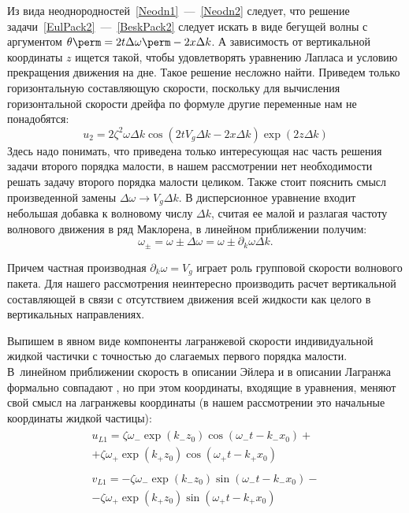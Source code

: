 Из вида неоднородностей~\eqref{Neodn1}~---~\eqref{Neodn2} следует, что решение задачи~\eqref{EulPack2}~---~\eqref{BeskPack2} следует искать в виде бегущей волны с аргументом  $ \theta\perm= 2 t \Delta \omega \perm- 2 x \Delta k $. А зависимость от вертикальной координаты $ z $  ищется такой, чтобы удовлетворять уравнению Лапласа и условию прекращения движения на дне. Такое решение несложно найти. Приведем только горизонтальную составляющую скорости, поскольку для вычисления горизонтальной скорости дрейфа по формуле  другие переменные нам не понадобятся:
\begin{equation*}
u_{2}=2\zeta^{2}\omega \Delta k \cos \left( 2 t V_{g} \Delta k - 2 x \Delta k \right) \exp \left( 2 z \Delta k \right)
\end{equation*}
Здесь надо понимать, что приведена только интересующая нас часть решения задачи второго порядка малости, в нашем рассмотрении нет необходимости решать задачу второго порядка малости целиком. Также стоит пояснить смысл произведенной замены  $ \Delta \omega \rightarrow V_{g} \Delta k $. В дисперсионное уравнение входит небольшая добавка к волновому числу  $ \Delta k $, считая ее малой и разлагая частоту волнового движения в ряд Маклорена, в линейном приближении получим:
\begin{equation*}
\omega_{\pm}=\omega \pm \Delta \omega = \omega \pm \partial_{k} \omega \Delta k.
\end{equation*}

Причем частная производная  $ \partial_{k}\omega = V_{g} $ играет роль групповой скорости волнового пакета. Для нашего рассмотрения неинтересно производить расчет вертикальной составляющей в связи с отсутствием движения всей жидкости как целого в вертикальных направлениях. 

Выпишем в явном виде компоненты лагранжевой скорости индивидуальной жидкой частички с точностью до слагаемых первого порядка малости. В~линейном приближении скорость в описании Эйлера и в описании Лагранжа формально совпадают \parencite{Landau}, но при этом координаты, входящие в уравнения, меняют свой смысл на лагранжевы координаты (в нашем рассмотрении это начальные координаты жидкой частицы):
\begin{gather}
\begin{gathered}
u_{L1}=\zeta \omega_{-}\exp \left( k_{-} z_{0}\right) \cos \left( \omega_{-} t - k_{-} x_{0} \right)+\\
+\zeta \omega_{+}\exp \left( k_{+} z_{0}\right) \cos \left( \omega_{+} t - k_{+} x_{0} \right)
\label{ul1Pack}
\end{gathered}
\\
\begin{gathered}
v_{L1}=-\zeta \omega_{-}\exp \left( k_{-} z_{0}\right) \sin \left( \omega_{-} t - k_{-} x_{0} \right)-\\
-\zeta \omega_{+}\exp \left( k_{+} z_{0}\right) \sin \left( \omega_{+} t - k_{+} x_{0} \right)
\label{vl1Pack}
\end{gathered}
\end{gather}
	  	
